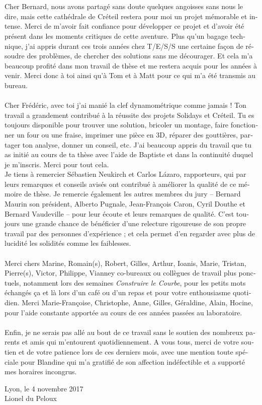 \begin{otherlanguage}{french}
\\
\\
Cher Bernard, nous avons partagé sans doute quelques angoisses sans nous le dire, mais cette cathédrale de Créteil restera pour moi un projet mémorable et intense. Merci de m'avoir fait confiance pour développer ce projet et d'avoir été présent dans les moments critiques de cette aventure. Plus qu'un bagage technique, j'ai appris durant ces trois années chez T/E/S/S une certaine façon de résoudre des problèmes, de chercher des solutions sans me décourager. Et cela m'a beaucoup profité dans mon travail de thèse et me restera acquis pour les années à venir. Merci donc à toi ainsi qu'à Tom et à Matt pour ce qui m'a été transmis au bureau.
\\
\\
Cher Frédéric, avec toi j'ai manié la clef dynamométrique comme jamais ! Ton travail a grandement contribué à la réussite des projets Solidays et Créteil. Tu es toujours disponible pour trouver une solution, bricoler un montage, faire fonctionner un four ou une fraise, imprimer une pièce en 3D, réparer des gouttières, partager ton analyse, donner un conseil, etc. J'ai beaucoup appris du travail que tu as initié au cours de ta thèse avec l'aide de Baptiste et dans la continuité duquel je m'inscris. Merci pour tout cela.
\\
Je tiens à remercier Sébastien Neukirch et Carlos Lázaro, rapporteurs, qui par leurs remarques et conseils avisés ont contribué à améliorer la qualité de ce mémoire de thèse. Je remercie également les autres membres du jury -- Bernard Maurin son président, Alberto Pugnale, Jean-François Caron, Cyril Douthe et Bernard Vaudeville -- pour leur écoute et leurs remarques de qualité. C'est toujours une grande chance de bénéficier d'une relecture rigoureuse de son propre travail par des personnes d'expérience ; et cela permet d'en regarder avec plus de lucidité les solidités comme les faiblesses.
\\
\\
Merci chers Marine, Romain(s), Robert, Gilles, Arthur, Ioanis, Marie, Tristan, Pierre(s), Victor, Philippe, Vianney \telp{} co-bureaux ou collègues de travail plus ponctuels, notamment lors des semaines \emph{Construire le Courbe}, pour les petits mots échangés ça et là lors d'un café ou d'un repas et pour votre enthousiasme quotidien. Merci Marie-Françoise, Christophe, Anne, Gilles, Géraldine, Alain, Hocine, pour l'aide constante apportée au cours de ces années passées au laboratoire.
\\
\\
Enfin, je ne serais pas allé au bout de ce travail sans le soutien des nombreux parents et amis qui m'entourent quotidiennement. A vous tous, merci de votre soutien et de votre patience lors de ces derniers mois, avec une mention toute spéciale pour Blandine qui m'a gratifié de son affection indéfectible et a supporté mes horaires incongrus.

\bigskip
\bigskip

\begin{flushright}
Lyon, le 4 novembre 2017\\
Lionel du Peloux
\end{flushright}

\end{otherlanguage}